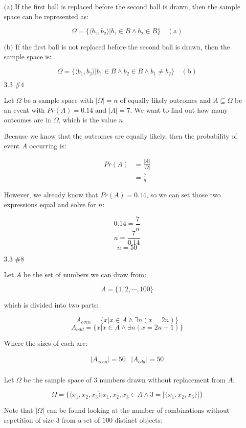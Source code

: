 \documentclass{article}
\newcommand{\problem}[2]{$\boxed{\text{#1 \##2}}$}
\newcommand{\subproblem}[1]{$\boxed{\text{(#1)}}$}
\newcommand{\subsolution}[2]{\boxed{#2\quad(\text{#1})}}
\newcommand{\solution}[1]{\boxed{#1}}
\newcommand{\multistep}[1]{\begin{array}{rl} #1 \end{array}}
\begin{document}
\begin{multicols*}{2}
%
\subproblem{a} If the first ball is replaced before the second ball is
drawn, then the sample space can be represented as:

\[
\subsolution{a}{\Omega = \{\langle b_1,b_2\rangle|b_1\in B\wedge b_2\in B\}}
\]

%
\subproblem{b} If the first ball is not replaced before the second
ball is drawn, then the sample space is:

\[
\subsolution{b}{\Omega = \{\langle b_1,b_2\rangle|b_1\in B\wedge b_2\in B\wedge b_1\ne b_2\}}
\]

%
\problem{3.3}{4}

Let $\Omega$ be a sample space with $|\Omega|=n$ of equally likely
outcomes and $A\subseteq\Omega$ be an event with $Pr(A)=0.14$ and
$|A|=7$. We want to find out how many outcomes are in $\Omega$, which
is the value $n$.

Because we know that the outcomes are equally likely, then the
probability of event $A$ occurring is:

\[
\multistep{
Pr(A)&=\frac{|A|}{|\Omega|} \\
&=\frac{7}{n}
}
\]

However, we already know that $Pr(A)=0.14$, so we can set those two
expressions equal and solve for $n$:

\[
0.14=\frac{7}{n}
\] \[
n=\frac{7}{0.14}
\] \[
\solution{n=50}
\]

%
\problem{3.3}{8}

Let $A$ be the set of numbers we can draw from:

\[
A=\{1,2,\cdots,100\}
\]

which is divided into two parts:

\[
A_{even}=\{x|x\in A\wedge\exists n(x=2n)\}
\] \[
A_{odd}=\{x|x\in A\wedge\exists n(x=2n+1)\}
\]

Where the sizes of each are:

\[
\begin{array}{cc}
|A_{even}|=50 & |A_{odd}|=50 \\
\end{array}
\]

Let $\Omega$ be the sample space of 3 numbers drawn without
replacement from $A$:

\[
\Omega=\{\langle x_1,x_2,x_3\rangle|x_1,x_2,x_3\in A\wedge 3=|\{x_1,x_2,x_3\}|\}
\]

Note that $|\Omega|$ can be found looking at the number of
combinations without repetition of size $3$ from a set of $100$
distinct objects:


\end{multicols*}
\end{document}
